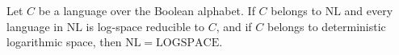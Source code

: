 \begin{theorem}
\label{Complexity.NL_eq_LOGSPACE_of_nlComplete_mem_LOGSPACE}
\leanok
{}
Let $C$ be a language over the Boolean alphabet. If $C$ belongs to $\mathrm{NL}$ and
every language in $\mathrm{NL}$ is log-space reducible to $C$, and if $C$ belongs to
deterministic logarithmic space, then $\mathrm{NL}=\mathrm{LOGSPACE}$.
\end{theorem}
